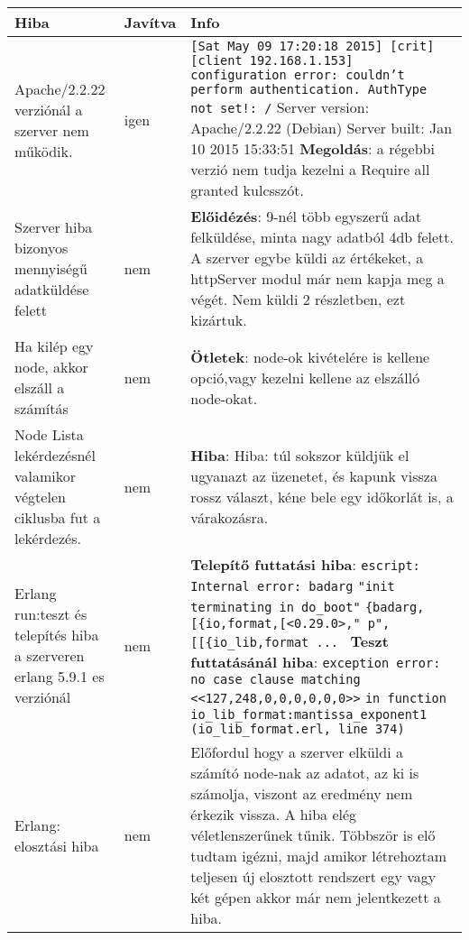   \begin{center}\begin{tabular}{| p{4cm} | p{1.5cm} | p{8cm} |}
  \hline Hiba & Javítva & Info
    \\ \hline
      	Apache/2.2.22 verziónál a szerver nem működik. 
      &
      	igen
      &
		\texttt{[Sat May 09 17:20:18 2015] [crit] [client 192.168.1.153] configuration error:  couldn't perform authentication. AuthType not set!: /}\newline
		Server version: Apache/2.2.22 (Debian)
		Server built:   Jan 10 2015 15:33:51 
		\newline\textbf{Megoldás}:
		a régebbi verzió nem tudja kezelni a Require all granted kulcsszót.
  	\\ \hline
    	Szerver hiba bizonyos mennyiségű adatküldése felett 
      &
    	nem
      &  
    	\textbf{Előidézés}: 9-nél több egyszerű adat felküldése, minta nagy adatból 4db felett.
    	A szerver egybe küldi az értékeket, a httpServer modul már nem kapja meg a végét. Nem küldi 2 részletben, ezt kizártuk.
    \\ \hline
        Ha kilép egy node, akkor elszáll a számítás 
      &
      	nem
      &
      \textbf{Ötletek}:
      node-ok kivételére is kellene opció,vagy kezelni kellene az elszálló node-okat.
    \\ \hline
        Node Lista lekérdezésnél valamikor végtelen ciklusba fut a lekérdezés. 
      &
      	nem
      &
      	\textbf{Hiba}:
		Hiba: túl sokszor küldjük el ugyanazt az üzenetet, és kapunk vissza rossz választ, kéne bele egy időkorlát is, a várakozásra.

    \\ \hline
    	Erlang run:teszt és telepítés hiba a szerveren erlang 5.9.1 es verziónál
      &
      	nem
      &
      	\textbf{Telepítő futtatási hiba}: \newline
      	\texttt{escript: Internal error: badarg}
		\texttt{"init terminating in do\_boot"}
        \texttt{\{badarg,[\{io,format,[<0.29.0>,"~p",}
        \texttt{[[\{io\_lib,format ... }
		\newline \textbf{Teszt futtatásánál hiba}: \newline
		\texttt{exception error: no case clause matching <<127,248,0,0,0,0,0,0>>}
     	\texttt{in function  io\_lib\_format:mantissa\_exponent\/1}
     	\texttt{(io\_lib\_format.erl, line 374) }
    \\ \hline
    	Erlang: elosztási hiba
      &
      	nem
      &
      	Előfordul hogy a szerver elküldi a számító node-nak az adatot, az ki is számolja, viszont az eredmény nem érkezik vissza.\newline
      	A hiba elég véletlenszerűnek tűnik. Többször is elő tudtam igézni, majd amikor létrehoztam teljesen új elosztott rendszert egy vagy két gépen akkor már nem jelentkezett a hiba.
    \\ \hline
  	\end{tabular}
	\end{center}